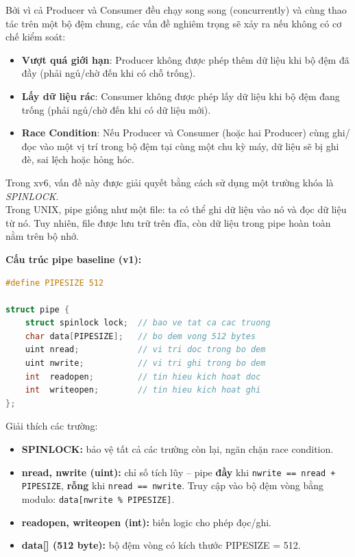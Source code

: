 \documentclass[12pt,a4paper]{article}
\newcommand{\code}[1]{\texttt{#1}}
\newcommand{\tightlist}{\setlength{\itemsep}{2pt}\setlength{\parskip}{0pt}}
\begin{document}
Bởi vì cả Producer và Consumer đều chạy song song (concurrently) và cùng thao tác trên một bộ đệm chung, các vấn đề nghiêm trọng sẽ xảy ra nếu không có cơ chế kiểm soát:
\begin{itemize}
    \item[]\textbf{Vượt quá giới hạn}: Producer không được phép thêm dữ liệu khi bộ đệm đã đầy (phải ngủ/chờ đến khi có chỗ trống).
    \item[]\textbf{Lấy dữ liệu rác}: Consumer không được phép lấy dữ liệu khi bộ đệm đang trống (phải ngủ/chờ đến khi có dữ liệu mới).
    \item[]\textbf{Race Condition}: Nếu Producer và Consumer (hoặc hai Producer) cùng ghi/đọc vào một vị trí trong bộ đệm tại cùng một chu kỳ máy, dữ liệu sẽ bị ghi đè, sai lệch hoặc hỏng hóc.
\end{itemize}
Trong xv6, vấn đề này được giải quyết bằng cách sử dụng một trường khóa là \textit{SPINLOCK}. \\
Trong UNIX, pipe giống như một file: ta có thể ghi dữ liệu vào nó và đọc dữ liệu từ nó.
Tuy nhiên, file được lưu trữ trên đĩa, còn dữ liệu trong pipe hoàn toàn nằm trên bộ nhớ.

\textbf{Cấu trúc pipe baseline (v1):}

\begin{lstlisting}[caption={struct pipe -- v1 baseline, PIPESIZE = 512 byte},
                   language=C, label={lst:pipe_v1}]
#define PIPESIZE 512

struct pipe {
    struct spinlock lock;  // bao ve tat ca cac truong
    char data[PIPESIZE];   // bo dem vong 512 bytes
    uint nread;            // vi tri doc trong bo dem
    uint nwrite;           // vi tri ghi trong bo dem
    int  readopen;         // tin hieu kich hoat doc
    int  writeopen;        // tin hieu kich hoat ghi
};
\end{lstlisting}

Giải thích các trường:
\begin{itemize}\tightlist
    \item \textbf{SPINLOCK:} bảo vệ tất cả các trường còn lại, ngăn chặn race condition.
    \item \textbf{nread, nwrite (uint):} chỉ số tích lũy -- pipe \textbf{đầy} khi
    \code{nwrite == nread + PIPESIZE}, \textbf{rỗng} khi \code{nread == nwrite}.
    Truy cập vào bộ đệm vòng bằng modulo: \code{data[nwrite \% PIPESIZE]}.
    \item \textbf{readopen, writeopen (int):} biến logic cho phép đọc/ghi.
    \item \textbf{data[] (512 byte):} bộ đệm vòng có kích thước PIPESIZE = 512.
\end{itemize}
\end{document}
